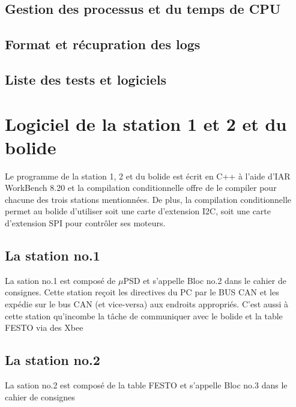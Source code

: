 \documentclass[10pt,a4paper,final]{article}
\begin{document}
\begin{spacing}{1.5}
\subsection{Gestion des processus et du temps de CPU}

\subsection{Format et récupration des logs}

\subsection{Liste des tests et logiciels}






\pagebreak
\section{Logiciel de la station 1 et 2 et du bolide}
Le programme de la station 1, 2 et du bolide est écrit en C++ à l'aide d'IAR WorkBench 8.20 et la compilation conditionnelle offre de le compiler pour chacune des trois stations mentionnées. De plus, la compilation conditionnelle permet au bolide d'utiliser soit une carte d'extension I2C, soit une carte d'extension SPI pour contrôler ses moteurs.

\subsection{La station no.1}
La sation no.1 est composé de $\mu$PSD et s'appelle Bloc no.2 dans le cahier de consignes. Cette station reçoit les directives du PC par le BUS CAN et les expédie sur le bus CAN (et vice-versa) aux endroits appropriés. C'est aussi à cette station qu'incombe la tâche de communiquer avec le bolide et la table FESTO via des Xbee
\subsection{La station no.2}
La sation no.2 est composé de la table FESTO et s'appelle Bloc no.3 dans le cahier de consignes


\end{spacing}
\end{document}
